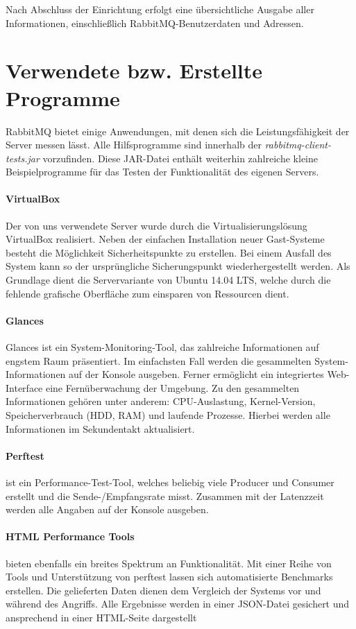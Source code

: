 \documentclass[	a4paper,
			11pt,
			titlepage,
			oneside,
			fleqn,
			listof=totoc,
			parskip,
			chapterprefix=false,
			numbers=noenddot]{scrartcl}
\begin{document}
	Nach Abschluss der Einrichtung erfolgt eine übersichtliche Ausgabe aller Informationen, einschließlich RabbitMQ-Benutzerdaten und Adressen.
	
	
\clearpage
\section*{Verwendete bzw. Erstellte Programme}
	
	RabbitMQ bietet einige Anwendungen, mit denen sich die Leistungsfähigkeit der Server messen lässt. Alle Hilfsprogramme sind innerhalb der \textit{rabbitmq-client-tests.jar} vorzufinden. Diese JAR-Datei enthält weiterhin zahlreiche kleine Beispielprogramme für das Testen der Funktionalität des eigenen Servers. 
	
	\paragraph{VirtualBox} Der von uns verwendete Server wurde durch die Virtualisierungslösung VirtualBox realisiert. Neben der einfachen Installation neuer Gast-Systeme besteht die Möglichkeit Sicherheitspunkte zu erstellen. Bei einem Ausfall des System kann so der ursprüngliche Sicherungspunkt wiederhergestellt werden. Als Grundlage dient die Servervariante von Ubuntu 14.04 LTS, welche durch die fehlende grafische Oberfläche zum einsparen von Ressourcen dient.
	
	\paragraph{Glances} Glances ist ein System-Monitoring-Tool, das zahlreiche Informationen auf engstem Raum präsentiert. Im einfachsten Fall werden die gesammelten System-Informationen auf der Konsole ausgeben. Ferner ermöglicht ein integriertes Web-Interface eine Fernüberwachung der Umgebung. Zu den gesammelten Informationen gehören unter anderem: CPU-Auslastung, Kernel-Version, Speicherverbrauch (HDD, RAM) und laufende Prozesse. Hierbei werden alle Informationen im Sekundentakt aktualisiert.

	\paragraph{Perftest} ist ein Performance-Test-Tool, welches beliebig viele Producer und Consumer erstellt und die Sende-/Empfangsrate misst. Zusammen mit der Latenzzeit werden alle Angaben auf der Konsole ausgeben.

	\paragraph{HTML Performance Tools} bieten ebenfalls ein breites Spektrum an Funktionalität. Mit einer Reihe von Tools und Unterstützung von perftest lassen sich automatisierte Benchmarks erstellen. Die gelieferten Daten dienen dem Vergleich der Systems vor und während des Angriffs. Alle Ergebnisse werden in einer JSON-Datei gesichert und ansprechend in einer HTML-Seite dargestellt
\end{document}
